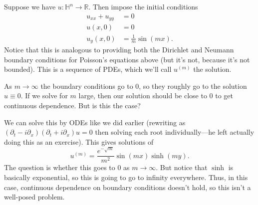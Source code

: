 \begin{example}
	Suppose we have \( u : \mathbb{H}^{n} \to \mathbb{R} \). Then impose the initial conditions
	\begin{align*}
		u_{x x} + u_{y y} &= 0 \\
		u(x, 0) &= 0 \\
		u_{y}(x, 0) &= \frac{1}{m} \sin(mx).
	\end{align*}
	Notice that this is analogous to providing both the Dirichlet and Neumann boundary conditions for Poisson's equations above (but it's not, because it's not bounded). This is a sequence of PDEs, which we'll call \( u^{(m)} \) the solution. 

	As \( m \to \infty \) the boundary conditions go to \( 0 \), so they roughly go to the solution \( u \equiv 0 \). If we solve for \( m \) large, then our solution should be close to \( 0 \) to get continuous dependence. But is this the case?

	We can solve this by ODEs like we did earlier (rewriting as \( (\partial_{t} - i \partial_{x})(\partial_{t} + i \partial_{x}) u = 0 \) then solving each root individually---he left actually doing this as an exercise). This gives solutions of 
	\[ u^{(m)} = \frac{e^{- \sqrt{ m}}}{m^{2}} \sin(mx) \sinh(m y). \]
	The question is whether this goes to \( 0 \) as \( m \to \infty \). But notice that \( \sinh \) is basically exponential, so this is going to go to infinity everywhere. Thus, in this case, continuous dependence on boundary conditions doesn't hold, so this isn't a well-posed problem.
\end{example}
